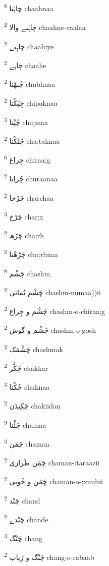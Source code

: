 \documentclass[12pt]{article}
\begin{document}
\begin{multicols}{5}
{\ur چاہْنا}   \textsuperscript{8} chaahnaa

{\ur چاہْنے والا}   \textsuperscript{2} chaahne-vaalaa

{\ur چاہِیے}   \textsuperscript{2} chaahiye

{\ur چاہے}   \textsuperscript{2} chaahe

{\ur چُبھْنا}   \textsuperscript{2} chubhnaa

{\ur چِپَکْنا}   \textsuperscript{2} chipaknaa

{\ur چُپْنا}   \textsuperscript{3} chupnaa

{\ur چَٹَکْنا}   \textsuperscript{2} cha;taknaa

{\ur چِراغ}   \textsuperscript{6} chiraa;g

{\ur چُرانا}   \textsuperscript{2} churaanaa

{\ur چَرْچا}   \textsuperscript{2} charchaa

{\ur چَرْخ}   \textsuperscript{3} char;x

{\ur چَڑھ}   \textsuperscript{2} cha;rh

{\ur چَڑھْنا}   \textsuperscript{2} cha;rhnaa

{\ur چَشْم}   \textsuperscript{8} chashm

{\ur چَشْم نُمائی}   \textsuperscript{2} chashm-numaa))ii

{\ur چَشْم و چِراغ}   \textsuperscript{2} chashm-o-chiraa;g

{\ur چَشْم و گوش}   \textsuperscript{2} chashm-o-gosh

{\ur چَشْمَک}   \textsuperscript{2} chashmak

{\ur چَکَّر}   \textsuperscript{2} chakkar

{\ur چُکْنا}   \textsuperscript{3} chuknaa

{\ur چَکِیدَن}   \textsuperscript{2} chakiidan

{\ur چَلْنا}   \textsuperscript{9} chalnaa

{\ur چَمَن}   \textsuperscript{3} chaman

{\ur چَمَن طَرازی}   \textsuperscript{2} chaman-:taraazii

{\ur چَمَن و خُوبی}   \textsuperscript{2} chaman-o-;xuubii

{\ur چَنْد}   \textsuperscript{2} chand

{\ur چَنْدے}   \textsuperscript{2} chande

{\ur چَنْگ}   \textsuperscript{3} chang

{\ur چَنْگ و رَباب}   \textsuperscript{2} chang-o-rabaab


\end{multicols}
\end{document}

